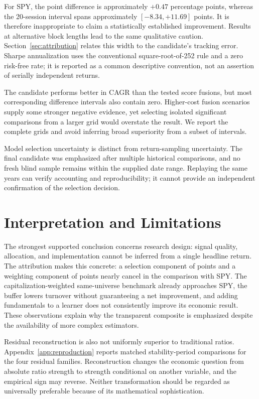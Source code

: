 \documentclass[11pt]{article}
\begin{document}
For SPY, the point difference is approximately $+0.47$ percentage points, whereas the 20-session interval spans approximately $[-8.34,+11.69]$ points. It is therefore inappropriate to claim a statistically established improvement. Results at alternative block lengths lead to the same qualitative caution. Section~\ref{sec:attribution} relates this width to the candidate's tracking error. Sharpe annualization uses the conventional square-root-of-252 rule and a zero risk-free rate; it is reported as a common descriptive convention, not an assertion of serially independent returns.

The candidate performs better in CAGR than the tested score fusions, but most corresponding difference intervals also contain zero. Higher-cost fusion scenarios supply some stronger negative evidence, yet selecting isolated significant comparisons from a larger grid would overstate the result. We report the complete grids and avoid inferring broad superiority from a subset of intervals.

Model selection uncertainty is distinct from return-sampling uncertainty. The final candidate was emphasized after multiple historical comparisons, and no fresh blind sample remains within the supplied date range. Replaying the same years can verify accounting and reproducibility; it cannot provide an independent confirmation of the selection decision.
\clearpage

\section{Interpretation and Limitations}
The strongest supported conclusion concerns research design: signal quality, allocation, and implementation cannot be inferred from a single headline return. The attribution makes this concrete: a selection component of \attrSel{} points and a weighting component of \attrWgt{} points nearly cancel in the comparison with SPY. The capitalization-weighted same-universe benchmark already approaches SPY, the buffer lowers turnover without guaranteeing a net improvement, and adding fundamentals to a learner does not consistently improve its economic result. These observations explain why the transparent composite is emphasized despite the availability of more complex estimators.

Residual reconstruction is also not uniformly superior to traditional ratios. Appendix~\ref{app:reproduction} reports matched stability-period comparisons for the four residual families. Reconstruction changes the economic question from absolute ratio strength to strength conditional on another variable, and the empirical sign may reverse. Neither transformation should be regarded as universally preferable because of its mathematical sophistication.
\end{document}
